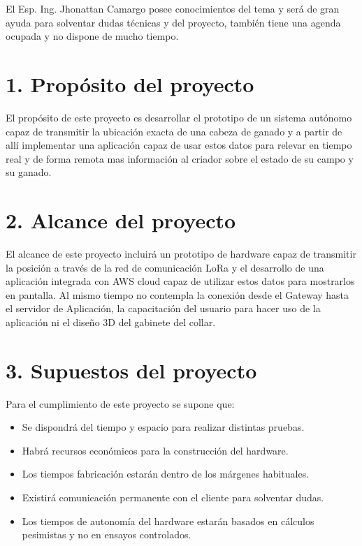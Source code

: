 \documentclass[11pt]{charter}
\begin{document}
El Esp. Ing. Jhonattan Camargo posee conocimientos del tema y será de gran ayuda para solventar dudas técnicas y del proyecto, también tiene una agenda ocupada y no dispone de mucho tiempo.



\section{1. Propósito del proyecto}
\label{sec:proposito}

El propósito de este proyecto es desarrollar el prototipo de un sistema autónomo capaz de transmitir la ubicación exacta de una cabeza de ganado y a partir de allí implementar una aplicación capaz de usar estos datos para relevar en tiempo real y de forma remota mas información al criador sobre el estado de su campo y su ganado. 

\section{2. Alcance del proyecto}
\label{sec:alcance}

El alcance de este proyecto incluirá un prototipo de hardware capaz de transmitir la posición a través de la red de comunicación LoRa y el desarrollo de una aplicación integrada con AWS cloud capaz de utilizar estos datos para mostrarlos en pantalla. Al mismo tiempo no contempla la conexión desde el Gateway hasta el servidor de Aplicación, la capacitación del usuario para hacer uso de la aplicación ni el diseño 3D del gabinete del collar. 


\section{3. Supuestos del proyecto}
\label{sec:supuestos}

Para el cumplimiento de este proyecto se supone que: 

\begin{itemize}
\item Se dispondrá del tiempo y espacio para realizar distintas pruebas.
\item Habrá recursos económicos para la construcción del hardware.
\item Los tiempos fabricación estarán dentro de los márgenes habituales.
\item Existirá comunicación permanente con el cliente para solventar dudas.
\item Los tiempos de autonomía del hardware estarán basados en cálculos pesimistas y no en ensayos controlados.
\end{itemize}
\end{document}
